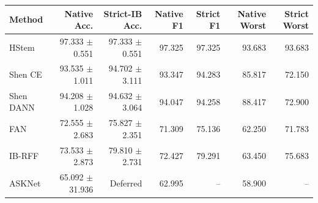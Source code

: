 \begin{tabular}{lrrrrrr}
\toprule Method & Native Acc. & Strict-IB Acc. & Native F1 & Strict F1 & Native Worst & Strict Worst\\ \midrule
HStem & 97.333 $\pm$ 0.551 & 97.333 $\pm$ 0.551 & 97.325 & 97.325 & 93.683 & 93.683 \\
Shen CE & 93.535 $\pm$ 1.011 & 94.702 $\pm$ 3.111 & 93.347 & 94.283 & 85.817 & 72.150 \\
Shen DANN & 94.208 $\pm$ 1.028 & 94.632 $\pm$ 3.064 & 94.047 & 94.258 & 88.417 & 72.900 \\
FAN & 72.555 $\pm$ 2.683 & 75.827 $\pm$ 2.351 & 71.309 & 75.136 & 62.250 & 71.783 \\
IB-RFF & 73.533 $\pm$ 2.873 & 79.810 $\pm$ 2.731 & 72.427 & 79.291 & 63.450 & 75.683 \\
ASKNet & 65.092 $\pm$ 31.936 & Deferred & 62.995 & -- & 58.900 & -- \\
\bottomrule\end{tabular}
